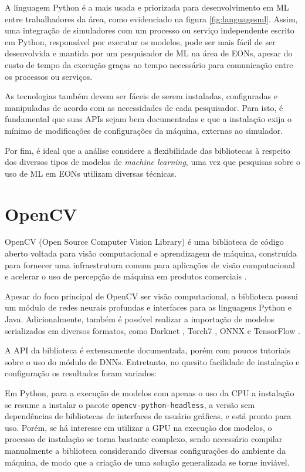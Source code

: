 A linguagem Python é a mais usada e priorizada para desenvolvimento em ML entre trabalhadores da área, como evidenciado na figura \ref{fig:languagesml}. Assim, uma integração de simuladores com um processo ou serviço independente escrito em Python, responsável por executar os modelos, pode ser mais fácil de ser desenvolvida e mantida por um pesquisador de ML na área de EONs, apesar do custo de tempo da execução graças ao tempo necessário para comunicação entre os processos ou serviços.

As tecnologias também devem ser fáceis de serem instaladas, configuradas e manipuladas de acordo com as necessidades de cada pesquisador. Para isto, é fundamental que suas \acrshort{API}s sejam bem documentadas e que a instalação exija o mínimo de modificações de configurações da máquina, externas ao simulador.

Por fim, é ideal que a análise considere a flexibilidade das bibliotecas à respeito dos diversos tipos de modelos de \textit{machine learning}, uma vez que pesquisas sobre o uso de ML em EONs utilizam diversas técnicas.

\section{OpenCV}

OpenCV (Open Source Computer Vision Library) é uma biblioteca de código aberto voltada para visão computacional e aprendizagem de máquina, construída para fornecer uma infraestrutura comum para aplicações de visão computacional e acelerar o uso de percepção de máquina em produtos comerciais \cite{ml_site_opencv}.

Apesar do foco principal de OpenCV ser visão computacional, a biblioteca possui um módulo de redes neurais profundas e interfaces para as linguagens Python e Java. Adicionalmente, também é possível realizar a importação de modelos serializados em diversos formatos, como Darknet \cite{ml_site_darknet}, Torch7 \cite{ml_site_torch}, ONNX \cite{ml_site_onnx} e TensorFlow \cite{ml_site_tensorflow}.

A \acrshort{API} da biblioteca é extensamente documentada, porém com poucos tutoriais sobre o uso do módulo de DNNs. Entretanto, no quesito facilidade de instalação e configuração os resultados foram variados:

Em Python, para a execução de modelos com apenas o uso da CPU a instalação se resume a instalar o pacote \texttt{opencv-python-headless}, a versão sem dependências de bibliotecas de interfaces de usuário gráficas, e está pronto para uso. Porém, se há interesse em utilizar a GPU na execução dos modelos, o processo de instalação se torna bastante complexo, sendo necessário compilar manualmente a biblioteca considerando diversas configurações do ambiente da máquina, de modo que a criação de uma solução generalizada se torne inviável.

